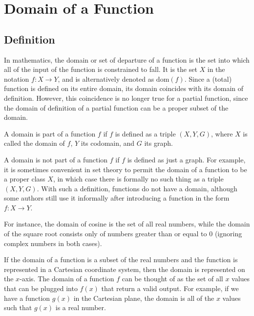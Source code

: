 \section{Domain of a Function}
\label{sec:doma-23ec}
\subsection{Definition}
\label{sss:defi-3061}

In mathematics, the domain or set of departure of a function is the set into which all of the input of the function is constrained to fall. It is the set $X$ in the notation $f: X \rightarrow Y$, and is alternatively denoted as $\text{dom}(f)$. Since a (total) function is defined on its entire domain, its domain coincides with its domain of definition. However, this coincidence is no longer true for a partial function, since the domain of definition of a partial function can be a proper subset of the domain.

A domain is part of a function $f$ if $f$ is defined as a triple $(X, Y, G)$, where $X$ is called the domain of $f$, $Y$ its codomain, and $G$ its graph.

A domain is not part of a function $f$ if $f$ is defined as just a graph. For example, it is sometimes convenient in set theory to permit the domain of a function to be a proper class $X$, in which case there is formally no such thing as a triple $(X, Y, G)$. With such a definition, functions do not have a domain, although some authors still use it informally after introducing a function in the form $f: X \rightarrow Y$.

For instance, the domain of cosine is the set of all real numbers, while the domain of the square root consists only of numbers greater than or equal to $0$ (ignoring complex numbers in both cases).

If the domain of a function is a subset of the real numbers and the function is represented in a Cartesian coordinate system, then the domain is represented on the $x$-axis. The domain of a function $f$ can be thought of as the set of all $x$ values that can be plugged into $f(x)$ that return a valid output. For example, if we have a function $g(x)$ in the Cartesian plane, the domain is all of the $x$ values such that $g(x)$ is a real number.

